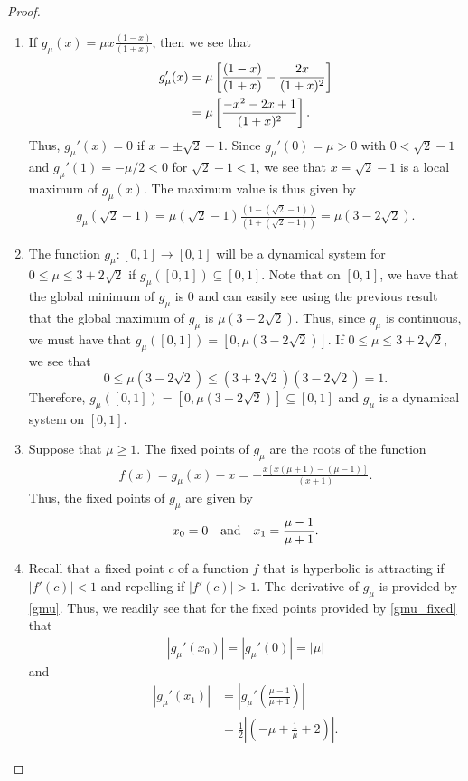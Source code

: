 \begin{proof}
  \begin{enumerate}
    \item If $\displaystyle g_\mu(x) = \mu x \frac{(1-x)}{(1+x)}$, then we see that
      \begin{align}\label{gmu}
        g_\mu'(x) &= \mu \left[\frac{(1-x)}{(1+x)} - \frac{2x}{(1+x)^2} \right] \notag \\
        &= \mu\left[\frac{-x^2-2x+1}{(1+x)^2}\right].
      \end{align}
      Thus, $g_\mu'(x) = 0$ if $x = \pm \sqrt{2} - 1$. Since $g_\mu'(0) = \mu > 0$ with $0 < \sqrt{2} - 1$
      and $g_\mu'(1) = -\mu/2 < 0$ for $\sqrt{2} -1 < 1$, we see that $x = \sqrt{2} - 1$ is a local maximum
      of $g_\mu(x)$. The maximum value is thus given by
      \begin{align*}
        g_\mu(\sqrt{2} - 1) = \mu (\sqrt{2} - 1) \frac{(1-(\sqrt{2} - 1))}{(1+(\sqrt{2} - 1))} = \mu(3 - 2\sqrt{2}).
      \end{align*}
    \item The function $g_\mu: [0, 1] \to [0, 1]$ will be a dynamical
      system for $0 \leq \mu \leq 3 + 2\sqrt{2}$ if $g_\mu([0,1]) \subseteq [0,1]$.
      Note that on $[0, 1]$, we have that the global minimum of $g_\mu$ is 0
      and can easily see using the previous result that the global maximum
      of $g_\mu$ is $\mu(3 - 2\sqrt{2})$. Thus, since $g_\mu$ is continuous, we must have that
      $g_\mu([0,1]) = [0, \mu(3 - 2\sqrt{2})]$. If $0 \leq \mu \leq 3 + 2\sqrt{2}$, we see that
      $$0 \leq \mu(3 - 2\sqrt{2}) \leq (3 + 2\sqrt{2})(3 - 2\sqrt{2}) = 1.$$
      Therefore,
      $g_\mu([0,1]) = [0, \mu(3 - 2\sqrt{2})] \subseteq [0, 1]$ and $g_\mu$ is a
      dynamical system on $[0, 1]$.
    \item Suppose that $\mu \geq 1$. The fixed points of $g_\mu$ are the roots of
      the function
      \begin{align*}
        f(x) = g_\mu(x) - x = - \frac{x[x(\mu+1) - (\mu - 1)]}{(x+1)}.
      \end{align*}
      Thus, the fixed points of $g_\mu$ are given by
      \begin{align}\label{gmu_fixed}
        x_0 = 0 \text{\quad and\quad} x_1 = \frac{\mu-1}{\mu+1}.
      \end{align}
    \item Recall that a fixed point $c$ of a function $f$ that is hyperbolic is attracting if $|f'(c)| < 1$ and
      repelling if $|f'(c)| > 1$. The derivative of $g_\mu$ is provided by \eqref{gmu}.
      Thus, we readily see that for the fixed points provided by \eqref{gmu_fixed}
      that
      \begin{align*}
        |g_\mu'(x_0)| = |g_\mu'(0)| = |\mu|
      \end{align*}
      and
      \begin{align*}
        |g_\mu'(x_1)| &= \left|g_\mu'\left(\frac{\mu-1}{\mu+1}\right)\right| \\
        &= \frac{1}{2}\left|\left(-\mu + \frac{1}{\mu} + 2\right)\right|.
      \end{align*}


\end{enumerate}
\end{proof}

